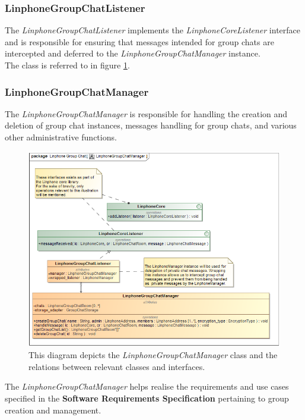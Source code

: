 \documentclass[11pt]{article}
\begin{document}
\subsubsection{LinphoneGroupChatListener}
The \textit{LinphoneGroupChatListener} implements the \textit{LinphoneCoreListener} interface and is responsible for ensuring that messages intended for group chats are intercepted and deferred to the \textit{LinphoneGroupChatManager} instance. \\
The class is referred to in figure \ref{cd-chat-manager}.
\subsubsection{LinphoneGroupChatManager}
The \textit{LinphoneGroupChatManager} is responsible for handling the creation and deletion of group chat instances, messages handling for group chats, and various other administrative functions.
\begin{figure}[H]
	\centering
	\includegraphics[width=5in]{./images/class_chat_manager.png}
	\caption[LinphoneGroupChatManager Class Diagram]{This diagram depicts the \textit{LinphoneGroupChatManager} class and the relations between relevant classes and interfaces.}
	\label{cd-chat-manager}
\end{figure}
The \textit{LinphoneGroupChatManager} helps realise the requirements and use cases specified in the \textbf{Software Requirements Specification} pertaining to group creation and management.
\end{document}
